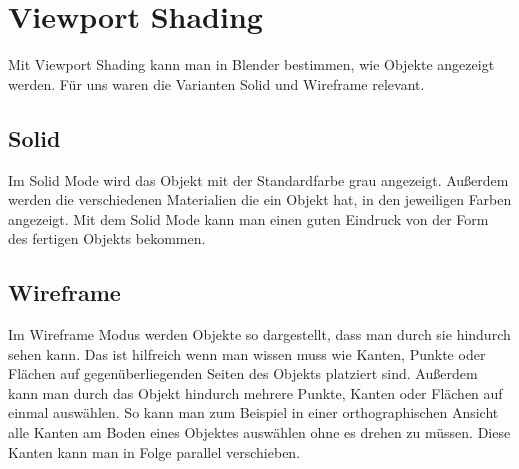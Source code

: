 \section{Viewport Shading}
Mit Viewport Shading kann man in Blender bestimmen, wie Objekte angezeigt werden. Für uns waren die Varianten Solid und Wireframe relevant.

\subsection{Solid}
Im Solid Mode wird das Objekt mit der Standardfarbe grau angezeigt.\citep{viewportshading:link} Außerdem werden die verschiedenen Materialien die ein Objekt
hat, in den jeweiligen Farben angezeigt. Mit dem Solid Mode kann man einen guten Eindruck von der Form des fertigen Objekts bekommen.

\subsection{Wireframe}
Im Wireframe Modus werden Objekte so dargestellt, dass man durch sie hindurch sehen kann.\citep{viewportshading:link}
Das ist hilfreich wenn man wissen muss wie Kanten, Punkte oder Flächen auf gegenüberliegenden Seiten des Objekts
platziert sind. Außerdem kann man durch das Objekt hindurch mehrere Punkte, Kanten oder Flächen auf einmal auswählen. So kann man zum Beispiel
in einer orthographischen Ansicht alle Kanten am Boden eines Objektes auswählen ohne es drehen zu müssen. Diese Kanten kann
man in Folge parallel verschieben.
